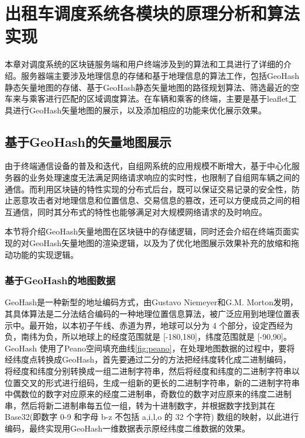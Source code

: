 \chapter{出租车调度系统各模块的原理分析和算法实现}

本章对调度系统的区块链服务端和用户终端涉及到的算法和工具进行了详细的介绍。服务器端主要涉及地理信息的存储和基于地理信息的算法工作，包括GeoHash静态矢量地图的存储、基于GeoHash静态矢量地图的路径规划算法、筛选最近的空车来与乘客进行匹配的区域调度算法。在车辆和乘客的终端，主要是基于leaflet工具进行GeoHash矢量地图的展示，以及添加相应的功能来优化展示效果。

\section{基于GeoHash的矢量地图展示}

由于终端通信设备的普及和迭代，自组网系统的应用规模不断增大，基于中心化服务器的业务处理速度无法满足网络请求响应的实时性，也限制了自组网车辆之间的通信。而利用区块链的特性实现的分布式后台，既可以保证交易记录的安全性，防止恶意攻击者对地理信息和位置信息、交易信息的篡改，还可以方便成员之间的相互通信，同时其分布式的特性也能够满足对大规模网络请求的及时响应。

本节将介绍GeoHash矢量地图在区块链中的存储逻辑，同时还会介绍在终端页面实现的对GeoHash矢量地图的渲染逻辑，以及为了优化地图展示效果补充的放缩和拖动功能的实现逻辑。

\subsection{基于GeoHash的地图数据}

GeoHash是一种新型的地址编码方式，由Gustavo Niemeyer和G.M. Morton发明，其具体算法是二分法结合编码的一种地理位置信息算法，被广泛应用到地理位置表示中。最开始，以本初子午线、赤道为界，地球可以分为 4 个部分，设定西经为负，南纬为负，所以地球上的经度范围就是 [-180,180]，纬度范围就是 [-90,90]。GeoHash 使用了Peano空间填充曲线\ref{fig:peano}，在处理地图数据的过程中，要将经纬度点转换成GeoHash，首先要通过二分的方法把经纬度转化成二进制编码，
将经度和纬度分别转换成一组二进制字符串，然后将经度和纬度的二进制字符串以位置交叉的形式进行组码，生成一组新的更长的二进制字符串，新的二进制字符串中偶数位的数字对应原来的经度二进制串，奇数位的数字对应原来的纬度二进制串，然后将新二进制串每五位一组，转为十进制数字，并根据数字找到其在Base32(即数字 0-9 和字母 b-z 不包括 a,i,l,o 的 32 个字符) 数组的映射，以此进行编码，最终实现用GeoHash一维数据表示原经纬度二维数据的效果。

